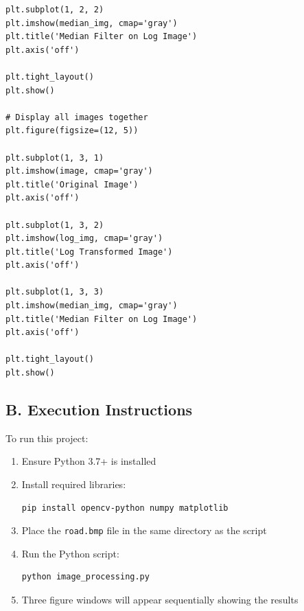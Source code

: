 \documentclass[12pt,a4paper]{article}
\begin{document}
\begin{lstlisting}[caption={Complete Python Implementation}]
plt.subplot(1, 2, 2)
plt.imshow(median_img, cmap='gray')
plt.title('Median Filter on Log Image')
plt.axis('off')

plt.tight_layout()
plt.show()

# Display all images together
plt.figure(figsize=(12, 5))

plt.subplot(1, 3, 1)
plt.imshow(image, cmap='gray')
plt.title('Original Image')
plt.axis('off')

plt.subplot(1, 3, 2)
plt.imshow(log_img, cmap='gray')
plt.title('Log Transformed Image')
plt.axis('off')

plt.subplot(1, 3, 3)
plt.imshow(median_img, cmap='gray')
plt.title('Median Filter on Log Image')
plt.axis('off')

plt.tight_layout()
plt.show()
\end{lstlisting}

\subsection*{B. Execution Instructions}
{}

To run this project:
\begin{enumerate}
    \item Ensure Python 3.7+ is installed
    \item Install required libraries:
    \begin{lstlisting}[language=bash]
pip install opencv-python numpy matplotlib
    \end{lstlisting}
    \item Place the \texttt{road.bmp} file in the same directory as the script
    \item Run the Python script:
    \begin{lstlisting}[language=bash]
python image_processing.py
    \end{lstlisting}
    \item Three figure windows will appear sequentially showing the results
\end{enumerate}
\end{document}
